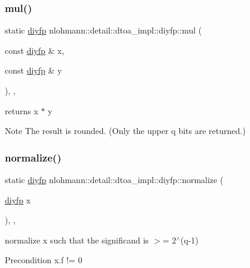 \subsubsection{\texorpdfstring{mul()}{mul()}}
{\footnotesize\ttfamily static \mbox{\hyperlink{structnlohmann_1_1detail_1_1dtoa__impl_1_1diyfp}{diyfp}} nlohmann\+::detail\+::dtoa\+\_\+impl\+::diyfp\+::mul (\begin{DoxyParamCaption}\item[{const \mbox{\hyperlink{structnlohmann_1_1detail_1_1dtoa__impl_1_1diyfp}{diyfp}} \&}]{x,  }\item[{const \mbox{\hyperlink{structnlohmann_1_1detail_1_1dtoa__impl_1_1diyfp}{diyfp}} \&}]{y }\end{DoxyParamCaption})\hspace{0.3cm}{\ttfamily [inline]}, {\ttfamily [static]}, {\ttfamily [noexcept]}}



returns x $\ast$ y 

\begin{DoxyNote}{Note}
The result is rounded. (Only the upper q bits are returned.) 
\end{DoxyNote}
\mbox{\label{structnlohmann_1_1detail_1_1dtoa__impl_1_1diyfp_a2246b5b40c7c6992153ef174063d6aa6}} 
\subsubsection{\texorpdfstring{normalize()}{normalize()}}
{\footnotesize\ttfamily static \mbox{\hyperlink{structnlohmann_1_1detail_1_1dtoa__impl_1_1diyfp}{diyfp}} nlohmann\+::detail\+::dtoa\+\_\+impl\+::diyfp\+::normalize (\begin{DoxyParamCaption}\item[{\mbox{\hyperlink{structnlohmann_1_1detail_1_1dtoa__impl_1_1diyfp}{diyfp}}}]{x }\end{DoxyParamCaption})\hspace{0.3cm}{\ttfamily [inline]}, {\ttfamily [static]}, {\ttfamily [noexcept]}}



normalize x such that the significand is $>$= 2$^\wedge$(q-\/1) 

\begin{DoxyPrecond}{Precondition}
x.\+f != 0 
\end{DoxyPrecond}
\mbox{\label{structnlohmann_1_1detail_1_1dtoa__impl_1_1diyfp_a6b6665e467ebabe0c0f7418d3fe4b118}} 
